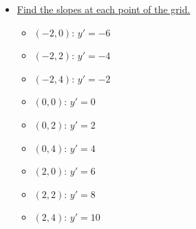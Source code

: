 \documentclass[12pt]{article}
\begin{document}
\begin{itemize}
	\item \underline{Find the slopes at each point of the grid.}
		\begin{multicols}{3}
		\begin{itemize}
		\item $(-2, 0)$: $y' = -6$
		\item $(-2, 2)$: $y' = -4$
		\item $(-2, 4)$: $y' = -2$
		\item $(0, 0)$: $y' = 0$
		\item $(0, 2)$: $y' = 2$
		\item $(0, 4)$: $y' = 4$
		\item $(2, 0)$: $y' = 6$
		\item $(2, 2)$: $y' = 8$
		\item $(2, 4)$: $y' = 10$
		\end{itemize}
		\end{multicols}
		

\end{itemize}
\end{document}
